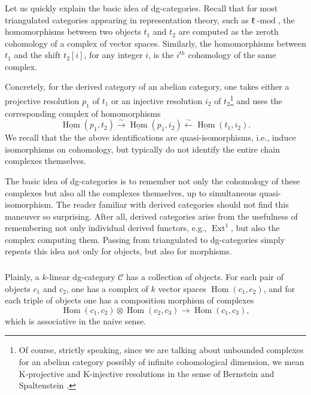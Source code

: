 \documentclass[10pt]{amsart}
\newcommand{\on}{\operatorname}
\renewcommand{\mod}{\on{-mod}}
\theoremstyle{remark}
\newcommand{\fk}{\mathfrak{k}}
\newcommand{\Hom}{\operatorname{Hom}}
\newcommand{\Ext}{\operatorname{Ext}}
\numberwithin{equation}{section}
\newcommand{\sC}{\mathscr{C}}
\renewcommand{\mod}{\operatorname{-mod}}
\begin{document}
	
	\subsubsection{} Let us quickly explain the basic idea of dg-categories. 
	Recall that for most triangulated categories appearing in 
	representation theory, such as $\fk\mod$, the homomorphisms between two 
	objects $t_1$ and $t_2$ are computed as the zeroth cohomology of a complex 
	of vector spaces. Similarly, the homomorphisms between $t_1$ and the shift  
	$t_2[i]$, for any integer $i$, is the $i^{th}$ cohomology of the same 
	complex.
	
	Concretely, for the derived category of an abelian category, one takes 
	either a projective resolution $p_1$ of $t_1$ or an injective resolution 
	$i_2$ of 
	$t_2$\footnote{Of course, strictly speaking, since we are talking about 
	unbounded complexes for an abelian category possibly of infinite 
	cohomological 
	dimension, we mean K-projective and K-injective resolutions in the 
	sense of Bernstein and Spaltenstein \cite{spaltenstein}.} and uses the corresponding complex of 
	homomorphisms 
	\[
	  \underline{\Hom}(p_1, t_2) \xrightarrow{\sim} \underline{\Hom}(p_1, i_2) \xleftarrow{\sim} 
	  \underline{\Hom}(t_1, i_2).  
	\]
	We recall that the the above identifications are quasi-isomorphisms, i.e., induce isomorphisms on cohomology, but typically do not identify the entire chain complexes themselves. 
	
	
	The basic idea of dg-categories is to remember not only the cohomology of 
	these complexes but also all the complexes themselves, up to simultaneous quasi-isomorphism. The reader familiar with 
	derived categories should not find this maneuver so surprising. 
	After all, derived categories arise from the usefulness of remembering not only individual derived functors, e.g., $\Ext^1$, but also the complex computing them. 
	Passing from triangulated to dg-categories simply repeats this idea not 
	only for objects, but also for morphisms. 
	 
  \subsubsection{} Plainly, a $k$-linear dg-category $\sC$ has a collection of 
  objects. 
  For 
  each pair of objects $c_1$ and $c_2$, one has a complex of $k$ vector spaces  
  $\Hom(c_1, c_2)$, and for each triple of objects one has a composition 
  morphism of complexes
  \[
  \Hom(c_1, c_2) \otimes \Hom(c_2, c_3) \rightarrow \Hom(c_1, c_3), 
    \]
%	
	which is associative in the naive sense. 
	
\end{document}
